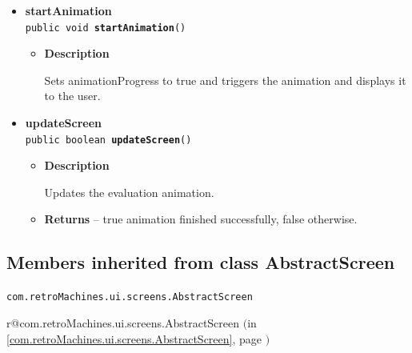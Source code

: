 \documentclass[11pt,a4paper]{report}
\makeatletter
\newcommand{\refdefined}[1]{
\expandafter\ifx\csname r@#1\endcsname\relax
\relax\else
{$($in \ref{#1}, page \pageref{#1}$)$}\fi}
\makeatother
\begin{document}
{{{{{{{{{{{{\begin{itemize}
{\begin{itemize}
{Assigns a lambda term to the screen for the animation.
}
\item{
{\bf  Parameters}
  \begin{itemize}
   \item{
\texttt{t} -- the lambda term in question}
  \end{itemize}
}%
\end{itemize}
}%
\item{ 
{\bf  startAnimation}\\
\texttt{public void\ {\bf  startAnimation}()
\label{com.retroMachines.ui.screens.game.EvaluationScreen.startAnimation()}}%
\begin{itemize}
\item{
{\bf  Description}

Sets animationProgress to true and triggers the animation and displays it to the user.
}
\end{itemize}
}%
\item{ 
{\bf  updateScreen}\\
\texttt{public boolean\ {\bf  updateScreen}()
\label{com.retroMachines.ui.screens.game.EvaluationScreen.updateScreen()}}%
\begin{itemize}
\item{
{\bf  Description}

Updates the evaluation animation.
}
\item{{\bf  Returns} -- 
true animation finished successfully, false otherwise. 
}%
\end{itemize}
}%
\end{itemize}
}
\subsection{Members inherited from class AbstractScreen }{
\texttt{com.retroMachines.ui.screens.AbstractScreen} {\small 
\refdefined{com.retroMachines.ui.screens.AbstractScreen}}
{\small 

}}}}}}}}}}}}}
\end{document}
